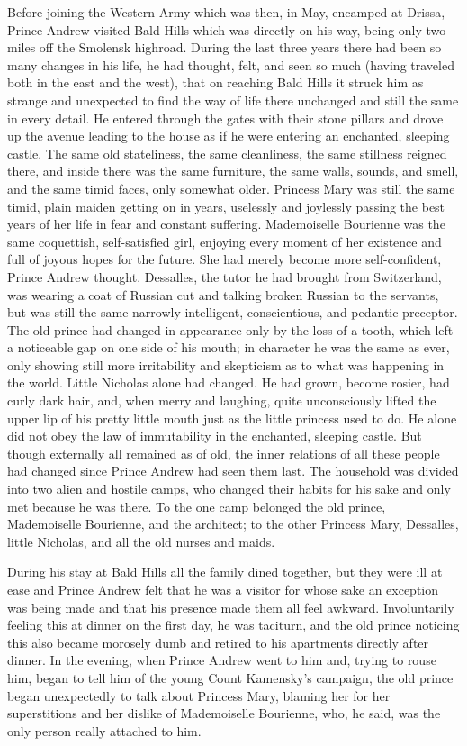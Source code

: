 Before joining the Western Army which was then, in May, encamped
at Drissa, Prince Andrew visited Bald Hills which was directly on
his way, being only two miles off the Smolensk highroad. During
the last three years there had been so many changes in his life,
he had thought, felt, and seen so much (having traveled both in
the east and the west), that on reaching Bald Hills it struck him
as strange and unexpected to find the way of life there unchanged
and still the same in every detail. He entered through the gates
with their stone pillars and drove up the avenue leading to the
house as if he were entering an enchanted, sleeping castle. The
same old stateliness, the same cleanliness, the same stillness
reigned there, and inside there was the same furniture, the same
walls, sounds, and smell, and the same timid faces, only somewhat
older. Princess Mary was still the same timid, plain maiden
getting on in years, uselessly and joylessly passing the best
years of her life in fear and constant suffering. Mademoiselle
Bourienne was the same coquettish, self-satisfied girl, enjoying
every moment of her existence and full of joyous hopes for the
future. She had merely become more self-confident, Prince Andrew
thought. Dessalles, the tutor he had brought from Switzerland,
was wearing a coat of Russian cut and talking broken Russian to
the servants, but was still the same narrowly intelligent,
conscientious, and pedantic preceptor. The old prince had changed
in appearance only by the loss of a tooth, which left a
noticeable gap on one side of his mouth; in character he was the
same as ever, only showing still more irritability and skepticism
as to what was happening in the world. Little Nicholas alone had
changed. He had grown, become rosier, had curly dark hair, and,
when merry and laughing, quite unconsciously lifted the upper lip
of his pretty little mouth just as the little princess used to
do. He alone did not obey the law of immutability in the
enchanted, sleeping castle. But though externally all remained as
of old, the inner relations of all these people had changed since
Prince Andrew had seen them last. The household was divided into
two alien and hostile camps, who changed their habits for his
sake and only met because he was there. To the one camp belonged
the old prince, Mademoiselle Bourienne, and the architect; to the
other Princess Mary, Dessalles, little Nicholas, and all the old
nurses and maids.

During his stay at Bald Hills all the family dined together, but
they were ill at ease and Prince Andrew felt that he was a
visitor for whose sake an exception was being made and that his
presence made them all feel awkward. Involuntarily feeling this
at dinner on the first day, he was taciturn, and the old prince
noticing this also became morosely dumb and retired to his
apartments directly after dinner. In the evening, when Prince
Andrew went to him and, trying to rouse him, began to tell him of
the young Count Kamensky's campaign, the old prince began
unexpectedly to talk about Princess Mary, blaming her for her
superstitions and her dislike of Mademoiselle Bourienne, who, he
said, was the only person really attached to him.


